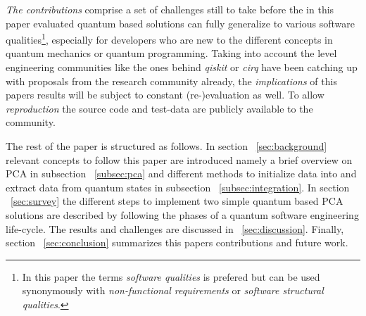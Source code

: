 \emph{The contributions} comprise a set of challenges still to take before the in this paper evaluated quantum based solutions can fully generalize to various software qualities\footnote{In this paper the terms \emph{software qualities} is prefered but can be used synonymously with \emph{non-functional requirements} or \emph{software structural qualities}.}, especially for developers who are new to the different concepts in quantum mechanics or quantum programming. Taking into account the level engineering communities like the ones behind \emph{qiskit} or \emph{cirq} have been catching up with proposals from the research community already, the \emph{implications} of this papers results will be subject to constant (re-)evaluation as well. To allow \emph{reproduction} the source code and test-data are publicly available to the community. \cite{github_repo}

The rest of the paper is structured as follows. In section ~\ref{sec:background} relevant concepts to follow this paper are introduced namely a brief overview on PCA in subsection ~\ref{subsec:pca} and different methods to initialize data into and extract data from quantum states in subsection ~\ref{subsec:integration}. In section ~\ref{sec:survey} the different steps to implement two simple quantum based PCA solutions are described by following the phases of a quantum software engineering life-cycle. The results and challenges are discussed in ~\ref{sec:discussion}. Finally, section ~\ref{sec:conclusion} summarizes this papers contributions and future work.
